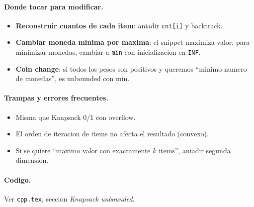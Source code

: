 \paragraph{Donde tocar para modificar.}
\begin{itemize}\setlength\itemsep{0pt}
	\item \textbf{Reconstruir cuantos de cada item}: aniadir \texttt{cnt[i]} y backtrack.
	\item \textbf{Cambiar moneda minima por maxima}: el snippet maximiza valor; para minimizar monedas, cambiar a \texttt{min} con inicializacion en \texttt{INF}.
	\item \textbf{Coin change}: si todos los pesos son positivos y queremos ``minimo numero de monedas'', es unbounded con min.
\end{itemize}

\paragraph{Trampas y errores frecuentes.}
\begin{itemize}\setlength\itemsep{0pt}
	\item Misma que Knapsack 0/1 con overflow.
	\item El orden de iteracion de items no afecta el resultado (convexo).
	\item Si se quiere ``maximo valor con exactamente $k$ items'', aniadir segunda dimension.
\end{itemize}

\paragraph{Codigo.}
Ver \texttt{cpp.tex}, seccion \textit{Knapsack unbounded}.

\vspace{0.5em}
